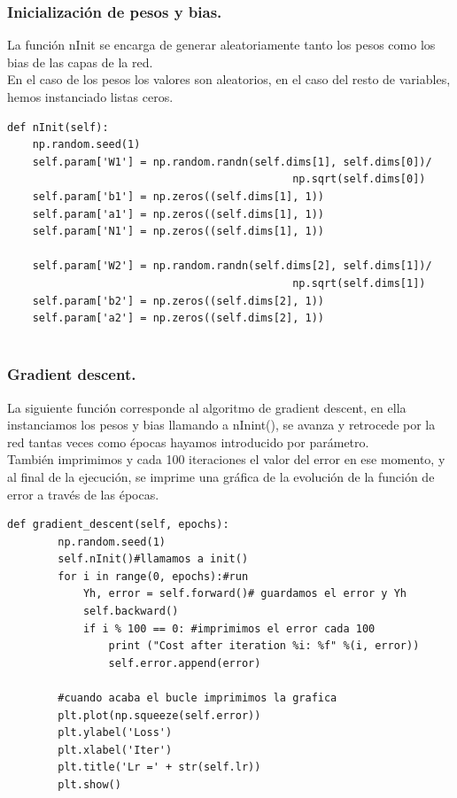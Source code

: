 \documentclass[a4paper,11pt]{article}
\begin{document}
\subsubsection{Inicialización de pesos y bias.}

La función nInit se encarga de generar aleatoriamente tanto los pesos como los bias de las capas de la red.\\
En el caso de los pesos los valores son aleatorios, en el caso del resto de variables, hemos instanciado listas ceros.
\begin{lstlisting}
def nInit(self): 
    np.random.seed(1)
    self.param['W1'] = np.random.randn(self.dims[1], self.dims[0])/ 
                                             np.sqrt(self.dims[0]) 
    self.param['b1'] = np.zeros((self.dims[1], 1))   
    self.param['a1'] = np.zeros((self.dims[1], 1))        
    self.param['N1'] = np.zeros((self.dims[1], 1))             
     
    self.param['W2'] = np.random.randn(self.dims[2], self.dims[1])/ 
                                             np.sqrt(self.dims[1]) 
    self.param['b2'] = np.zeros((self.dims[2], 1))     
    self.param['a2'] = np.zeros((self.dims[2], 1))   
      
\end{lstlisting}
\subsubsection{Gradient descent.}

La siguiente función corresponde al algoritmo de gradient descent, en ella instanciamos los pesos y bias llamando a nInint(), se avanza y retrocede por la red tantas veces como épocas hayamos introducido por parámetro. \\

\noindent
También imprimimos y cada 100 iteraciones el valor del error en ese momento, y al final de la ejecución, se imprime una gráfica de la evolución de la función de error a través de las épocas.
\begin{lstlisting}
def gradient_descent(self, epochs):
        np.random.seed(1)                         
        self.nInit()#llamamos a init()
        for i in range(0, epochs):#run
            Yh, error = self.forward()# guardamos el error y Yh
            self.backward()
            if i % 100 == 0: #imprimimos el error cada 100 
                print ("Cost after iteration %i: %f" %(i, error)) 
                self.error.append(error) 

        #cuando acaba el bucle imprimimos la grafica	
        plt.plot(np.squeeze(self.error))
        plt.ylabel('Loss')
        plt.xlabel('Iter')
        plt.title('Lr =' + str(self.lr))
        plt.show()        

\end{lstlisting}
\end{document}

